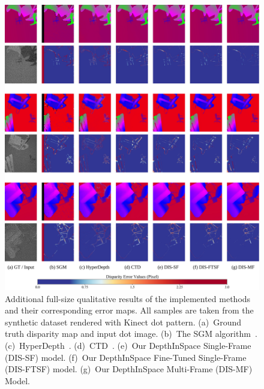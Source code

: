 \begin{figure}
    \begin{center}
        \includegraphics[width=1\linewidth]{images/chapter2/supp_figures/supp_results_1.jpg}
    \end{center}
   \caption{Additional full-size qualitative results of the implemented methods and their corresponding error maps. All samples are taken from the synthetic dataset rendered with Kinect dot pattern. (a)~Ground truth disparity map and input dot image. (b)~The SGM algorithm~\cite{hirschmuller2007stereo}. (c)~HyperDepth~\cite{ryan2016hyperdepth}. (d)~CTD~\cite{riegler2019connecting}. (e)~Our DepthInSpace Single-Frame (DIS-SF) model. (f)~Our DepthInSpace Fine-Tuned Single-Frame (DIS-FTSF) model. (g)~Our DepthInSpace Multi-Frame (DIS-MF) Model.}
    \label{fig:c2_kinect_results}
\end{figure}


